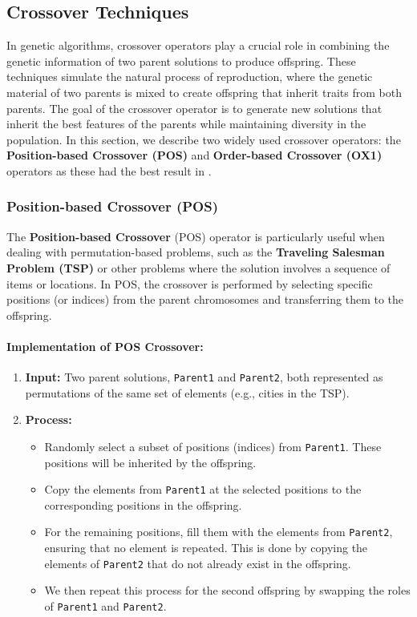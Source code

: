 \documentclass[12pt]{article}
\begin{document}
\subsection{Crossover Techniques}

In genetic algorithms, crossover operators play a crucial role in combining the genetic information of two parent solutions to produce offspring. These techniques simulate the natural process of reproduction, where the genetic material of two parents is mixed to create offspring that inherit traits from both parents. The goal of the crossover operator is to generate new solutions that inherit the best features of the parents while maintaining diversity in the population. In this section, we describe two widely used crossover operators: the \textbf{Position-based Crossover (POS)} and \textbf{Order-based Crossover (OX1)} operators as these had the best result in \cite{Larranaga1999}.

\subsubsection{Position-based Crossover (POS)}

The \textbf{Position-based Crossover} (POS) operator is particularly useful when dealing with permutation-based problems, such as the \textbf{Traveling Salesman Problem (TSP)} or other problems where the solution involves a sequence of items or locations. In POS, the crossover is performed by selecting specific positions (or indices) from the parent chromosomes and transferring them to the offspring.

\paragraph{Implementation of POS Crossover:}

\begin{enumerate}
    \item \textbf{Input:} Two parent solutions, \texttt{Parent1} and \texttt{Parent2}, both represented as permutations of the same set of elements (e.g., cities in the TSP).
    \item \textbf{Process:}
    \begin{itemize}
        \item Randomly select a subset of positions (indices) from \texttt{Parent1}. These positions will be inherited by the offspring.
        \item Copy the elements from \texttt{Parent1} at the selected positions to the corresponding positions in the offspring.
        \item For the remaining positions, fill them with the elements from \texttt{Parent2}, ensuring that no element is repeated. This is done by copying the elements of \texttt{Parent2} that do not already exist in the offspring.
        \item We then repeat this process for the second offspring by swapping the roles of \texttt{Parent1} and \texttt{Parent2}.
    \end{itemize}
\end{enumerate}
\end{document}

